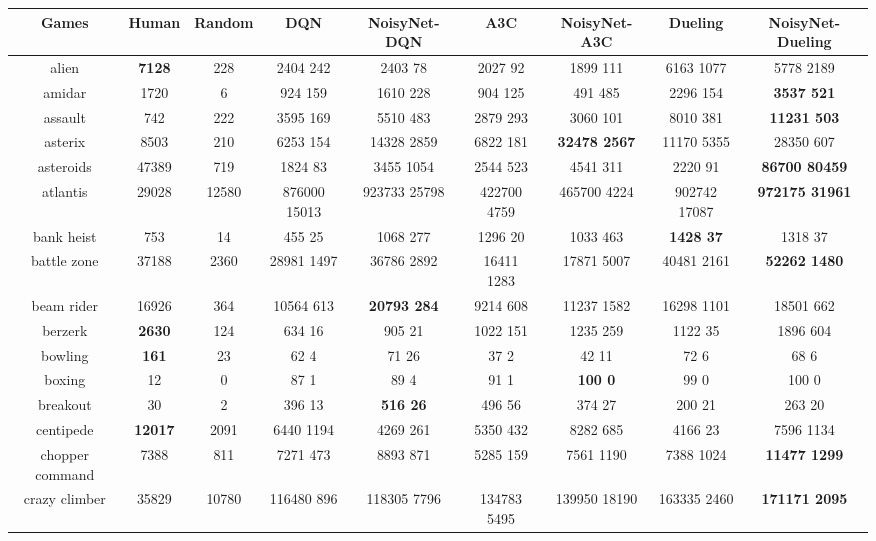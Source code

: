 \documentclass{article}
\begin{document}
\begin{table}[!ht]
\centering
\tiny
\begin{tabular}{|c|c|c|c|c|c|c|c|c|}
\hline
 Games & Human & Random & DQN & NoisyNet-DQN & A3C & NoisyNet-A3C & Dueling & NoisyNet-Dueling \\
\hline
 alien & \bf{7128} & 228 & 2404  242 & 2403  78 & 2027  92 & 1899  111 & 6163  1077 & 5778  2189 \\
 amidar & 1720 & 6 & 924  159 & 1610  228 & 904  125 & 491  485 & 2296  154 & \bf{3537  521} \\
 assault & 742 & 222 & 3595  169 & 5510  483 & 2879  293 & 3060  101 & 8010  381 & \bf{11231  503} \\
 asterix & 8503 & 210 & 6253  154 & 14328  2859 & 6822  181 & \bf{32478  2567} & 11170  5355 & 28350  607 \\
 asteroids & 47389 & 719 & 1824  83 & 3455  1054 & 2544  523 & 4541  311 & 2220  91 & \bf{86700  80459} \\
 atlantis & 29028 & 12580 & 876000  15013 & 923733  25798 & 422700  4759 & 465700  4224 & 902742  17087 & \bf{972175  31961} \\
 bank heist & 753 & 14 & 455  25 & 1068  277 & 1296  20 & 1033  463 & \bf{1428  37} & 1318  37 \\
 battle zone & 37188 & 2360 & 28981  1497 & 36786  2892 & 16411  1283 & 17871  5007 & 40481  2161 & \bf{52262  1480} \\
 beam rider & 16926 & 364 & 10564  613 & \bf{20793  284} & 9214  608 & 11237  1582 & 16298  1101 & 18501  662 \\
 berzerk & \bf{2630} & 124 & 634  16 & 905  21 & 1022  151 & 1235  259 & 1122  35 & 1896  604 \\
 bowling & \bf{161} & 23 & 62  4 & 71  26 & 37  2 & 42  11 & 72  6 & 68  6 \\
 boxing & 12 & 0 & 87  1 & 89  4 & 91  1 & \bf{100  0} & 99  0 & 100  0 \\
 breakout & 30 & 2 & 396  13 & \bf{516  26} & 496  56 & 374  27 & 200  21 & 263  20 \\
 centipede & \bf{12017} & 2091 & 6440  1194 & 4269  261 & 5350  432 & 8282  685 & 4166  23 & 7596  1134 \\
 chopper command & 7388 & 811 & 7271  473 & 8893  871 & 5285  159 & 7561  1190 & 7388  1024 & \bf{11477  1299} \\
 crazy climber & 35829 & 10780 & 116480  896 & 118305  7796 & 134783  5495 & 139950  18190 & 163335  2460 & \bf{171171  2095} \\

\end{tabular}
\end{table}
\end{document}
